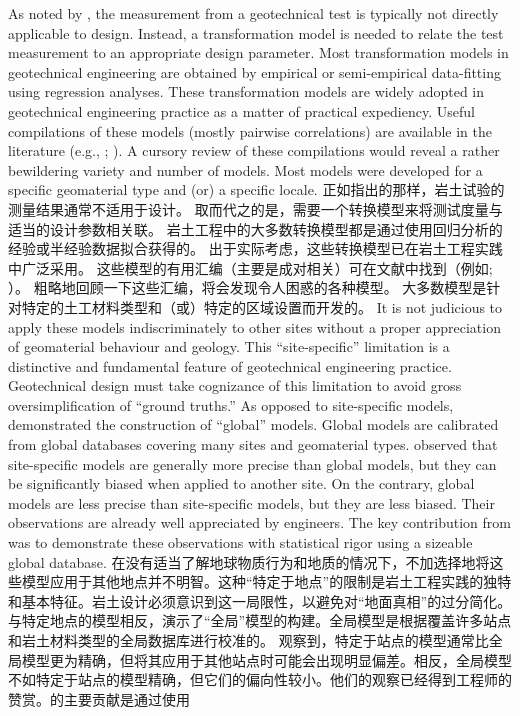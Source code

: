 \begin{paracol}{2}
\begin{Parallel}{0.60\textwidth}{}
{    }
    \ParallelPar
    \ParallelLText
    {
        As noted by \citet{Phoon1999612}, the measurement from a geotechnical test is typically not directly applicable to design. Instead, a transformation model is needed to relate the test measurement to an appropriate design parameter. Most transformation models in geotechnical engineering are obtained by empirical or semi-empirical data-fitting using regression analyses. These transformation models are widely adopted in geotechnical engineering practice as a matter of practical expediency. Useful compilations of these models (mostly pairwise correlations) are available in the literature (e.g., \citealp{Kulhawy1990}; \citealp{Mayne2001}). A cursory review of these compilations would reveal a rather bewildering variety and number of models. Most models were developed for a specific geomaterial type and (or) a specific locale.
    }
    \ParallelRText
    {
        正如\citet{Phoon1999612}指出的那样，岩土试验的测量结果通常不适用于设计。 取而代之的是，需要一个转换模型来将测试度量与适当的设计参数相关联。 岩土工程中的大多数转换模型都是通过使用回归分析的经验或半经验数据拟合获得的。 出于实际考虑，这些转换模型已在岩土工程实践中广泛采用。 这些模型的有用汇编（主要是成对相关）可在文献中找到（例如\citealp{Kulhawy1990}; \citealp{Mayne2001}）。 粗略地回顾一下这些汇编，将会发现令人困惑的各种模型。 大多数模型是针对特定的土工材料类型和（或）特定的区域设置而开发的。
    }
    \ParallelPar
    \ParallelLText
    {
        It is not judicious to apply these models indiscriminately to other sites without a proper appreciation of geomaterial behaviour and geology. This “site-specific” limitation is a distinctive and fundamental feature of geotechnical engineering practice. Geotechnical design must take cognizance of this limitation to avoid gross oversimplification of “ground truths.” As opposed to site-specific models, \citet{Ching201252} demonstrated the construction of “global” models. Global models are calibrated from global databases covering many sites and geomaterial types. \citet{Ching201252} observed that site-specific models are generally more precise than global models, but they can be significantly biased when applied to another site. On the contrary, global models are less precise than site-specific models, but they are less biased. Their observations are already well appreciated by engineers. The key contribution from \citet{Ching201252} was to demonstrate these observations with statistical rigor using
        a sizeable global database.
    }
    \ParallelRText
    {
        在没有适当了解地球物质行为和地质的情况下，不加选择地将这些模型应用于其他地点并不明智。这种“特定于地点”的限制是岩土工程实践的独特和基本特征。岩土设计必须意识到这一局限性，以避免对“地面真相”的过分简化。与特定地点的模型相反，\citet{Ching201252}演示了“全局”模型的构建。全局模型是根据覆盖许多站点和岩土材料类型的全局数据库进行校准的。 \citet{Ching201252}观察到，特定于站点的模型通常比全局模型更为精确，但将其应用于其他站点时可能会出现明显偏差。相反，全局模型不如特定于站点的模型精确，但它们的偏向性较小。他们的观察已经得到工程师的赞赏。\citet{Ching201252}的主要贡献是通过使用
}
\end{Parallel}
\end{paracol}
